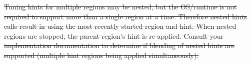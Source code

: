 \documentclass[12pt]{report} %
\providecommand{\DIFdeltex}[1]{{\protect\color{red}\sout{#1}}}                      %
\providecommand{\DIFdel}[1]{\texorpdfstring{\DIFdeltex{#1}}{}} %
\begin{document}


\DIFdel{Tuning hints for multiple regions may be nested, but the OS/runtime is not required to support more than a single
region at a time. Therefore nested hints calls result in using the most recently started region and hint. When nested
regions are stopped, the parent region's hint is re-applied. Consult your 
implementation documentation to determine if blending of nested hints are supported (multiple hint regions being applied
simultaneously). 
}%

\end{document}
